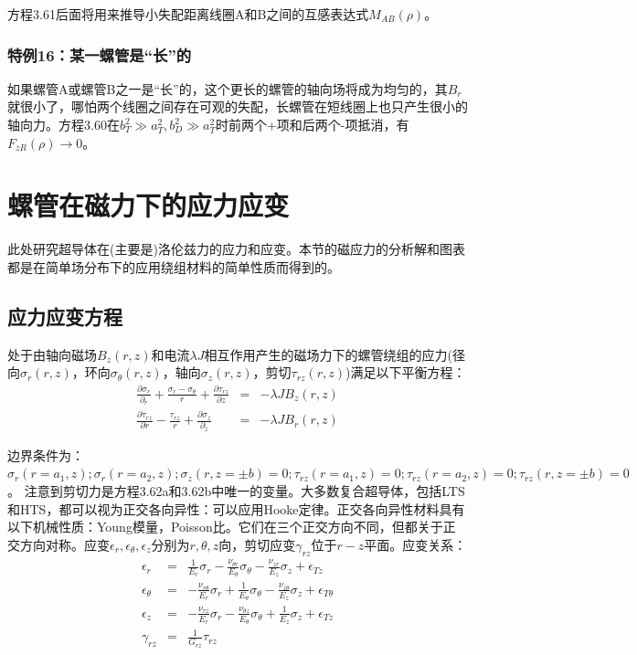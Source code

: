 方程3.61后面将用来推导小失配距离线圈A和B之间的互感表达式$M_{AB}(\rho)$。

\subsubsection{特例16：某一螺管是“长”的}
如果螺管A或螺管B之一是“长”的，这个更长的螺管的轴向场将成为均匀的，其$B_r$就很小了，哪怕两个线圈之间存在可观的失配，长螺管在短线圈上也只产生很小的轴向力。方程3.60在$b^2_T\gg a_T^2,b_D^2\gg a_T^2$时前两个+项和后两个-项抵消，有$F_{zR}(\rho)\rightarrow 0$。

\section{螺管在磁力下的应力应变}
此处研究超导体在(主要是)洛伦兹力的应力和应变。本节的磁应力的分析解和图表都是在简单场分布下的应用绕组材料的简单性质而得到的。

\subsection{应力应变方程}
处于由轴向磁场$B_z(r,z)$和电流$\lambda J$相互作用产生的磁场力下的螺管绕组的应力(径向$\sigma_r(r,z)$，环向$\sigma_\theta(r,z)$，轴向$\sigma_z(r,z)$，剪切$\tau_{rz}(r,z)$)满足以下平衡方程：
\begin{eqnarray}
\frac{\partial\sigma_{r}}{\partial_r}+\frac{\sigma_{r}-\sigma_{\theta}}{r}+\frac{\partial \tau_{rz}}{\partial z}&=&-\lambda JB_z(r,z)\\
\frac{\partial \tau_{rz}}{\partial r}-\frac{\tau_{rz}}{r}+\frac{\partial \sigma_z}{\partial_z}&=&-\lambda JB_r(r,z)
\end{eqnarray}

边界条件为：$\sigma_r(r=a_1,z);\sigma_r(r=a_2,z);\sigma_z(r,z=\pm b)=0;\tau_{rz}(r=a_1,z)=0;\tau_{rz}(r=a_2,z)=0;\tau_{rz}(r,z=\pm b)=0$。
注意到剪切力是方程3.62a和3.62b中唯一的变量。大多数复合超导体，包括LTS和HTS，都可以视为正交各向异性：可以应用Hooke定律。正交各向异性材料具有以下机械性质：Young模量，Poisson比。它们在三个正交方向不同，但都关于正交方向对称。应变$\epsilon_r,\epsilon_\theta,\epsilon_z$分别为$r,\theta,z$向，剪切应变$\gamma_{rz}$位于$r-z$平面。应变关系：
\begin{eqnarray}
\epsilon_r&=&\frac{1}{E_r}\sigma_r-\frac{\nu_{\theta r}}{E_{\theta}}\sigma_{\theta}-\frac{\nu_{zr}}{E_z}\sigma_z+\epsilon_{Tz}\\
\epsilon_\theta&=&-\frac{\nu_{r\theta}}{E_r}\sigma_r+\frac{1}{E_{\theta}}\sigma_{\theta}-\frac{\nu_{z\theta}}{E_z}\sigma_z+\epsilon_{T\theta}\\
\epsilon_z&=&-\frac{\nu_{rz}}{E_r}\sigma_r-\frac{\nu_{\theta z}}{E_{\theta}}\sigma_{\theta}+\frac{1}{E_z}\sigma_z+\epsilon_{Tz}\\
\gamma_{rz}&=&\frac{1}{G_{{rz}}}\tau_{rz}
\end{eqnarray}

